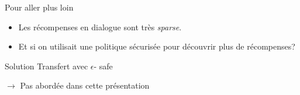 \documentclass[french]{beamer}
\begin{document}
    \begin{frame}{Pour aller plus loin}

        \begin{itemize}
            \item Les récompenses en dialogue sont très \textit{sparse}.
            \item Et si on utilisait une politique sécurisée pour découvrir plus de récompenses?
        \end{itemize}

        \begin{exampleblock}{Solution}
            Transfert avec $\epsilon$- safe
        \end{exampleblock}
        $\rightarrow$ Pas abordée dans cette présentation
    \end{frame}
\end{document}
